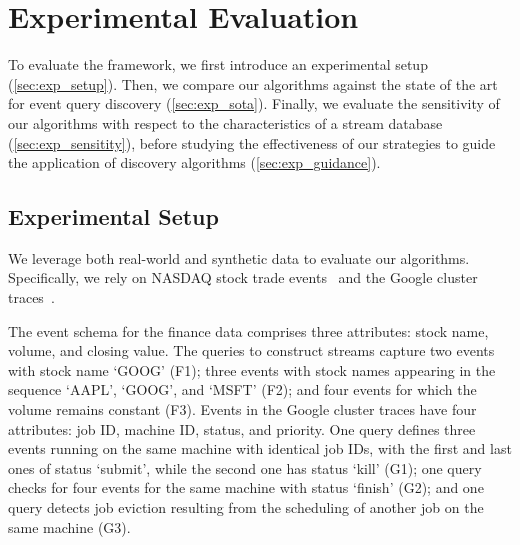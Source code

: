 \section{Experimental Evaluation}
\label{sec:evaluation}

To evaluate the \sys{} framework, we
first introduce an experimental setup (\autoref{sec:exp_setup}). Then, we
compare our algorithms against the state of the art for event query
discovery (\autoref{sec:exp_sota}). Finally, we evaluate the sensitivity of
our algorithms with respect to the characteristics of a stream database
(\autoref{sec:exp_sensitity}), before studying the effectiveness of our
strategies to guide the application of discovery algorithms
(\autoref{sec:exp_guidance}).

\subsection{Experimental Setup}
\label{sec:exp_setup}


We leverage both real-world and synthetic data to
evaluate our algorithms.
Specifically, we rely on NASDAQ stock trade events~\cite{eodata}
and the Google cluster traces~\cite{reiss2011google}.

The event schema for the finance data comprises three attributes: stock
name, volume, and closing value. The queries to construct streams capture
two events with stock name `GOOG' (F1); three events with stock names
appearing in the sequence `AAPL', `GOOG', and `MSFT' (F2); and four events
for which the volume remains constant (F3).
Events in the Google cluster traces have four attributes:
job ID, machine ID, status, and priority. One query
defines three events running on the same machine with identical job IDs,
with the first and last ones of status `submit', while the second one has
status `kill' (G1); one query checks for four events for the same
machine with status `finish' (G2); and one query detects job eviction
resulting from the scheduling of another job on the same machine (G3).

